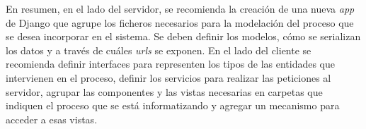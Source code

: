 En resumen, en el lado del servidor, se recomienda la creación de una nueva \textit{app} de Django que agrupe los ficheros necesarios para la modelación del 
proceso que se desea incorporar en el sistema. Se deben definir los modelos, cómo se serializan los datos y a través de cuáles \textit{urls} se exponen.
En el lado del cliente se recomienda definir interfaces para representen los tipos de las entidades que intervienen en el proceso, definir los servicios para realizar 
las peticiones al servidor, agrupar las componentes y las vistas necesarias en carpetas que indiquen el proceso que se está informatizando y agregar un mecanismo para 
acceder a esas vistas. 


    




